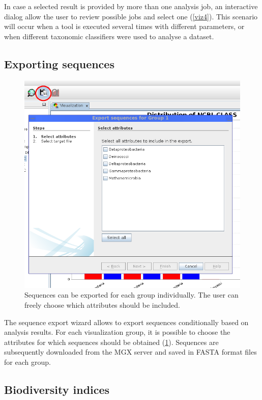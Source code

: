 In case a selected result is provided by more than one analysis job, an interactive dialog allow the user to
review possible jobs and select one (\ref{viz4}). This scenario will occur when a tool is executed several 
times with different parameters, or when different taxonomic classifiers were used to analyse a dataset.

\subsection{Exporting sequences}

\begin{figure}[H]
\centering
\includegraphics[width=.8\textwidth]{img/mgx/SeqExport}
\caption[Exporting sequences]{Sequences can be exported for each group individually. The user can freely choose
which attributes should be included.}
\label{seqexp}
\end{figure}

The sequence export wizard allows to export sequences conditionally based on analysis results. For each
visualization group, it is possible to choose the attributes for which sequences should be obtained (\ref{seqexp}).
Sequences are subsequently downloaded from the MGX server and saved in FASTA format files for each group.


\subsection{Biodiversity indices}

